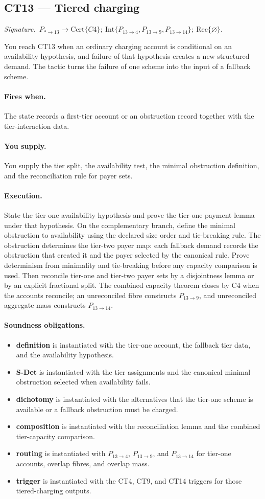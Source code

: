 \documentclass[
  11pt,
]{article}
\providecommand{\tightlist}{%
  \setlength{\itemsep}{0pt}\setlength{\parskip}{0pt}}
\theoremstyle{definition}
\newcommand{\ctsignature}[1]{\par\noindent\emph{Signature.}\ #1\par\medskip}
\newcommand{\ctcert}[1]{\mathrm{Cert}\{#1\}}
\newcommand{\ctint}[1]{\mathrm{Int}\{#1\}}
\newcommand{\ctrec}[1]{\mathrm{Rec}\{#1\}}
\newcommand{\ctnone}{\varnothing}
\newcommand{\ctpar}[1]{\paragraph{#1.}}
\begin{document}
\subsection{CT13 --- Tiered charging}\label{ct:13}\label{tiered-charging-scheme-failure-as-a-demand}
\ctsignature{\(P_{\ast\to13}\to \ctcert{C4};\ \ctint{P_{13\to4},P_{13\to9},P_{13\to14}};\ \ctrec{\ctnone}\).}

You reach CT13 when an ordinary charging account is conditional on an
availability hypothesis, and failure of that hypothesis creates a new
structured demand.  The tactic turns the failure of one scheme into the
input of a fallback scheme.

\ctpar{Fires when}
The state records a first-tier account or an obstruction record together
with the tier-interaction data.

\ctpar{You supply}
You supply the tier split, the availability test, the minimal obstruction
definition, and the reconciliation rule for payer sets.

\ctpar{Execution}
State the tier-one availability hypothesis and prove the tier-one payment
lemma under that hypothesis.  On the complementary branch, define the
minimal obstruction to availability using the declared size order and
tie-breaking rule.  The obstruction determines the tier-two payer map:
each fallback demand records the obstruction that created it and the
payer selected by the canonical rule.  Prove determinism from
minimality and tie-breaking before any capacity comparison is used.  Then
reconcile tier-one and tier-two payer sets by a disjointness lemma or by
an explicit fractional split.  The combined capacity theorem closes by
C4 when the accounts reconcile; an unreconciled fibre constructs
\(P_{13\to9}\), and unreconciled aggregate mass constructs
\(P_{13\to14}\).

\ctpar{Soundness obligations}
\begin{itemize}
\tightlist
\item \textbf{definition} is instantiated with the tier-one account, the fallback tier data, and the availability hypothesis.
\item \textbf{S-Det} is instantiated with the tier assignments and the canonical minimal obstruction selected when availability fails.
\item \textbf{dichotomy} is instantiated with the alternatives that the tier-one scheme is available or a fallback obstruction must be charged.
\item \textbf{composition} is instantiated with the reconciliation lemma and the combined tier-capacity comparison.
\item \textbf{routing} is instantiated with \(P_{13\to4}\), \(P_{13\to9}\), and \(P_{13\to14}\) for tier-one accounts, overlap fibres, and overlap mass.
\item \textbf{trigger} is instantiated with the CT4, CT9, and CT14 triggers for those tiered-charging outputs.
\end{itemize}
\end{document}
